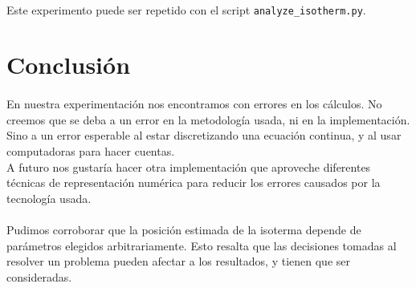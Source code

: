 \documentclass[12pt]{article}
\begin{document}
\paragraph{} Este experimento puede ser repetido con el script \texttt{analyze\_isotherm.py}.





\section{Conclusión}

\paragraph{} En nuestra experimentación nos encontramos con errores en los cálculos. No creemos que se deba a un error en la metodología usada, ni en la implementación. Sino a un error esperable al estar discretizando una ecuación continua, y al usar computadoras para hacer cuentas. \\
A futuro nos gustaría hacer otra implementación que aproveche diferentes técnicas de representación numérica para reducir los errores causados por la tecnología usada.
\paragraph{} Pudimos corroborar que la posición estimada de la isoterma depende de parámetros elegidos arbitrariamente. Esto resalta que las decisiones tomadas al resolver un problema pueden afectar a los resultados, y tienen que ser consideradas. 
\end{document}

